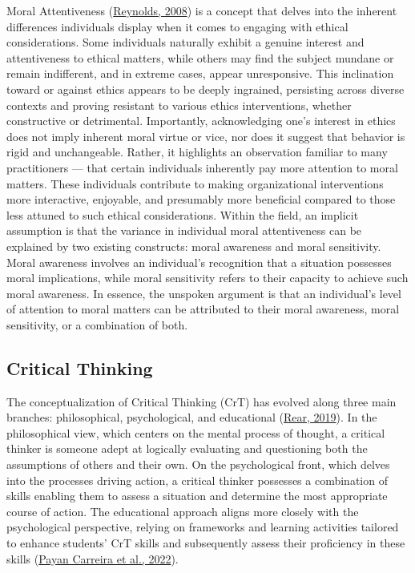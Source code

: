 \documentclass[
  12pt,
  a4paper,
  twoside]{article}
\begin{document}
Moral Attentiveness (\protect\hyperlink{ref-reynolds2008}{Reynolds, 2008}) is a concept that delves into the inherent differences individuals display when it comes to engaging with ethical considerations. Some individuals naturally exhibit a genuine interest and attentiveness to ethical matters, while others may find the subject mundane or remain indifferent, and in extreme cases, appear unresponsive. This inclination toward or against ethics appears to be deeply ingrained, persisting across diverse contexts and proving resistant to various ethics interventions, whether constructive or detrimental.
Importantly, acknowledging one's interest in ethics does not imply inherent moral virtue or vice, nor does it suggest that behavior is rigid and unchangeable. Rather, it highlights an observation familiar to many practitioners --- that certain individuals inherently pay more attention to moral matters. These individuals contribute to making organizational interventions more interactive, enjoyable, and presumably more beneficial compared to those less attuned to such ethical considerations.
Within the field, an implicit assumption is that the variance in individual moral attentiveness can be explained by two existing constructs: moral awareness and moral sensitivity. Moral awareness involves an individual's recognition that a situation possesses moral implications, while moral sensitivity refers to their capacity to achieve such moral awareness. In essence, the unspoken argument is that an individual's level of attention to moral matters can be attributed to their moral awareness, moral sensitivity, or a combination of both.

\hypertarget{critical-thinking}{%
\subsection{Critical Thinking}\label{critical-thinking}}

The conceptualization of Critical Thinking (CrT) has evolved along three main branches: philosophical, psychological, and educational (\protect\hyperlink{ref-rear2019}{Rear, 2019}). In the philosophical view, which centers on the mental process of thought, a critical thinker is someone adept at logically evaluating and questioning both the assumptions of others and their own. On the psychological front, which delves into the processes driving action, a critical thinker possesses a combination of skills enabling them to assess a situation and determine the most appropriate course of action. The educational approach aligns more closely with the psychological perspective, relying on frameworks and learning activities tailored to enhance students' CrT skills and subsequently assess their proficiency in these skills (\protect\hyperlink{ref-payan2022}{Payan Carreira et al., 2022}).
\end{document}
